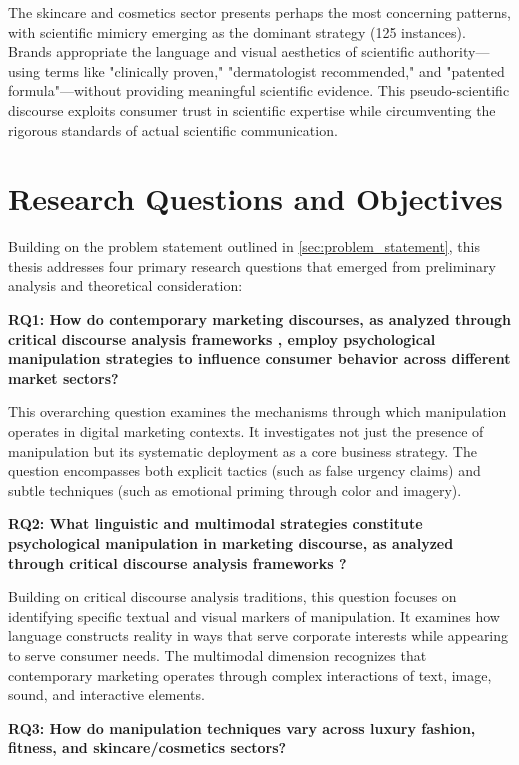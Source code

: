 The skincare and cosmetics sector presents perhaps the most concerning patterns, with scientific mimicry emerging as the dominant strategy (125 instances). Brands appropriate the language and visual aesthetics of scientific authority—using terms like "clinically proven," "dermatologist recommended," and "patented formula"—without providing meaningful scientific evidence. This pseudo-scientific discourse exploits consumer trust in scientific expertise while circumventing the rigorous standards of actual scientific communication.

\section{Research Questions and Objectives}
\label{sec:research_questions}

Building on the problem statement outlined in \autoref{sec:problem_statement}, this thesis addresses four primary research questions that emerged from preliminary analysis and theoretical consideration:

\textbf{RQ1: How do contemporary marketing discourses, as analyzed through critical discourse analysis frameworks \cite{fairclough2015language}, employ psychological manipulation strategies to influence consumer behavior across different market sectors?}

This overarching question examines the mechanisms through which manipulation operates in digital marketing contexts. It investigates not just the presence of manipulation but its systematic deployment as a core business strategy. The question encompasses both explicit tactics (such as false urgency claims) and subtle techniques (such as emotional priming through color and imagery).

\textbf{RQ2: What linguistic and multimodal strategies constitute psychological manipulation in marketing discourse, as analyzed through critical discourse analysis frameworks \cite{fairclough2015language}?}

Building on critical discourse analysis traditions, this question focuses on identifying specific textual and visual markers of manipulation. It examines how language constructs reality in ways that serve corporate interests while appearing to serve consumer needs. The multimodal dimension recognizes that contemporary marketing operates through complex interactions of text, image, sound, and interactive elements.

\textbf{RQ3: How do manipulation techniques vary across luxury fashion, fitness, and skincare/cosmetics sectors?}

